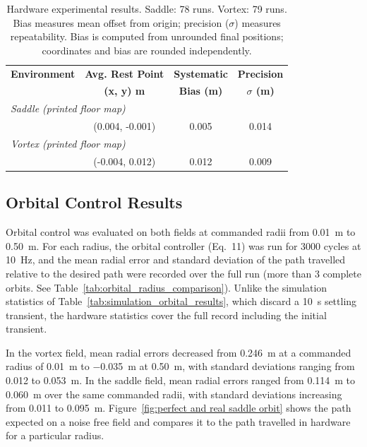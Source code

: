 \documentclass[lettersize,journal]{IEEEtran}
\begin{document}
\begin{table}[!t]
    \footnotesize
    \centering
    \caption{Hardware experimental results. Saddle: 78 runs. Vortex: 79 runs. Bias measures mean offset from origin; precision ($\sigma$) measures repeatability. Bias is computed from unrounded final positions; coordinates and bias are rounded independently.}
    \label{tab:estimation_results}
    \setlength{\tabcolsep}{4pt}
    \begin{tabular}{lccc}
    \hline
    \textbf{Environment} & \textbf{Avg. Rest Point} & \textbf{Systematic} & \textbf{Precision} \\
     & \textbf{(x, y) m} & \textbf{Bias (m)} & \textbf{$\sigma$ (m)} \\
    \hline
    \multicolumn{4}{l}{\textit{Saddle (printed floor map)}} \\
    \hline
     & (0.004, -0.001) & 0.005 & 0.014 \\
    \hline
    \multicolumn{4}{l}{\textit{Vortex (printed floor map)}} \\
    \hline
     & (-0.004, 0.012) & 0.012 & 0.009 \\
    \hline
    \end{tabular}
    \end{table}



\subsection{Orbital Control Results}

Orbital control was evaluated on both fields at commanded radii from 0.01~m to 0.50~m. For each radius, the orbital controller (Eq.~11) was run for 3000 cycles at 10~Hz, and the mean radial error and standard deviation of the path travelled relative to the desired path were recorded over the full run (more than 3 complete orbits. See Table~\ref{tab:orbital_radius_comparison}). Unlike the simulation statistics of Table~\ref{tab:simulation_orbital_results}, which discard a 10~s settling transient, the hardware statistics cover the full record including the initial transient.

 In the vortex field, mean radial errors decreased from 0.246~m at a commanded radius of 0.01~m to $-$0.035~m at 0.50~m, with standard deviations ranging from 0.012 to 0.053~m. In the saddle field, mean radial errors ranged from 0.114~m to 0.060~m over the same commanded radii, with standard deviations increasing from 0.011 to 0.095~m. Figure~\ref{fig:perfect and real saddle orbit} shows the path expected on a noise free field and compares it to the path travelled in hardware for a particular radius.
\end{document}
